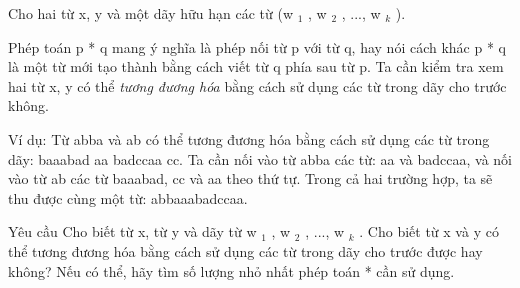 Cho hai từ x, y và một dãy hữu hạn các từ (w   $_    1   $   , w   $_    2   $   , ..., w   $_    k   $   ).  



   Phép toán p * q mang ý nghĩa là phép nối từ p với từ q, hay nói cách khác p * q là một từ mới tạo thành bằng cách viết từ q phía sau từ p.   Ta cần kiểm tra xem hai từ x, y có thể   \textit{    tương đương hóa   }   bằng cách sử dụng các từ trong dãy cho trước không.  

   Ví dụ: Từ abba và ab có thể tương đương hóa bằng cách sử dụng các từ trong dãy: baaabad aa badccaa cc. Ta cần nối vào từ abba các   từ: aa và badccaa, và nối vào từ ab các từ baaabad, cc và aa theo thứ tự. Trong cả hai trường hợp, ta sẽ thu được cùng một từ:   abbaaabadccaa.  

Yêu cầu
Cho biết từ x, từ y và dãy từ w   $_    1   $   , w   $_    2   $   , ..., w   $_    k   $   . Cho biết từ x và y có thể tương đương hóa bằng cách   sử dụng các từ trong dãy cho trước được hay không? Nếu có thể, hãy tìm số lượng nhỏ nhất phép toán * cần sử dụng.